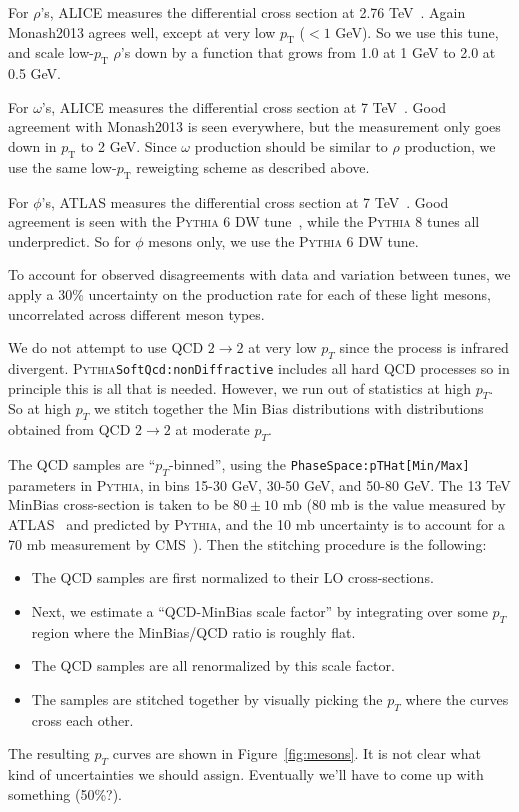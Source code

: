 \documentclass[12pt]{article}
\newcommand{\pythia}{\textsc{Pythia}\xspace}
\begin{document}
For $\rho$'s, ALICE measures the differential cross section at 2.76 TeV~\cite{ALICE:rho}.
Again Monash2013 agrees well, except at very low $p_\mathrm{T}$ ($<1$ GeV).
So we use this tune, and scale low-$p_\mathrm{T}$ $\rho$'s down by a function
that grows from 1.0 at 1 GeV to 2.0 at 0.5 GeV.

For $\omega$'s, ALICE measures the differential cross section at 7 TeV~\cite{ALICE:omega}.
Good agreement with Monash2013 is seen everywhere, but the measurement only goes down in 
$p_\mathrm{T}$ to 2 GeV. Since $\omega$ production should be similar to $\rho$ production,
we use the same low-$p_\mathrm{T}$ reweigting scheme as described above.

For $\phi$'s, ATLAS measures the differential cross section at 7 TeV~\cite{ATLAS:phi}.
Good agreement is seen with the \pythia 6 DW tune~\cite{pythia6DW}, while the \pythia 8 tunes all
underpredict. So for $\phi$ mesons only, we use the \pythia 6 DW tune.

To account for observed disagreements with data and variation between tunes, we apply
a 30\% uncertainty on the production rate for each of these light mesons, uncorrelated
across different meson types.

We do not attempt to use QCD $2 \to 2$ at very low $p_T$ since the 
process is infrared divergent.
\pythia \texttt{SoftQcd:nonDiffractive} includes all
hard QCD processes\cite{wwwPythia} so in principle this is all that is
needed.    However, we run out of statistics at high $p_T$.  So 
at high $p_T$ we stitch together the Min Bias distributions with 
distributions obtained from QCD $2 \to 2$ at moderate $p_T$.

The QCD samples are
``$p_T$-binned'', using the \texttt{PhaseSpace:pTHat[Min/Max]} parameters in \pythia, 
in bins 15-30 GeV, 30-50 GeV, and 50-80 GeV.  
The 13 TeV MinBias cross-section is taken to be $80\pm10$ mb (80 mb is the value measured by ATLAS~\cite{Atlas:ppxsec}
and predicted by \pythia, and the 10 mb uncertainty is to account for a 70 mb measurement by CMS~\cite{CMS:ppxsec}).  
Then the stitching procedure is the following:
\begin{itemize}
\item The QCD samples are first normalized to their LO cross-sections.
\item Next, we estimate a ``QCD-MinBias scale factor'' by integrating
  over some $p_T$ region where the MinBias/QCD ratio is roughly flat.
\item The QCD samples are all renormalized by this scale factor.
\item The samples are stitched together by visually picking the 
$p_T$ where the curves cross each other.
\end{itemize}
\noindent The resulting $p_T$ curves are shown in
Figure~\ref{fig:mesons}.  It is not clear what kind of uncertainties
we should assign.  Eventually we'll have to come up with something (50\%?).
\end{document}
